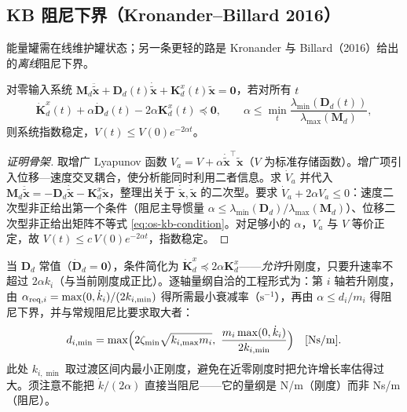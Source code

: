 \subsection{KB 阻尼下界（Kronander--Billard 2016）}
\label{sec:os-kb}

能量罐需在线维护罐状态；另一条更轻的路是 Kronander 与 Billard（2016）给出的\emph{离线}阻尼下界。

\begin{theorem}[KB 阻尼条件]
\label{thm:os-kb}
对零输入系统 $\mathbf M_d\ddot{\tilde{\mathbf x}}+\mathbf D_d(t)\dot{\tilde{\mathbf x}}+\mathbf K_d^x(t)\tilde{\mathbf x}=\mathbf 0$，若对所有 $t$
\begin{equation}
  \dot{\mathbf K}_d^x(t)+\alpha\dot{\mathbf D}_d(t)-2\alpha\mathbf K_d^x(t)\preceq\mathbf 0,\qquad
  \alpha\le\min_t\frac{\lambda_{\min}(\mathbf D_d(t))}{\lambda_{\max}(\mathbf M_d)},
  \label{eq:os-kb-condition}
\end{equation}
则系统指数稳定，$V(t)\le V(0)e^{-2\alpha t}$\cite{kronander2016stability}。
\end{theorem}
\begin{proof}[证明骨架]
取增广 Lyapunov 函数 $V_a=V+\alpha\dot{\tilde{\mathbf x}}^\top\tilde{\mathbf x}$（$V$ 为标准存储函数）。增广项引入位移—速度交叉耦合，使分析能同时利用二者信息。求 $\dot V_a$ 并代入 $\mathbf M_d\ddot{\tilde{\mathbf x}}=-\mathbf D_d\dot{\tilde{\mathbf x}}-\mathbf K_d^x\tilde{\mathbf x}$，整理出关于 $\dot{\tilde{\mathbf x}},\tilde{\mathbf x}$ 的二次型。要求 $\dot V_a+2\alpha V_a\le0$：速度二次型非正给出第一个条件（阻尼主导惯量 $\alpha\le\lambda_{\min}(\mathbf D_d)/\lambda_{\max}(\mathbf M_d)$）、位移二次型非正给出矩阵不等式 \cref{eq:os-kb-condition}。对足够小的 $\alpha$，$V_a$ 与 $V$ 等价正定，故 $V(t)\le c\,V(0)e^{-2\alpha t}$，指数稳定。
\end{proof}

当 $\mathbf D_d$ 常值（$\dot{\mathbf D}_d=\mathbf 0$），条件简化为 $\dot{\mathbf K}_d^x\preceq2\alpha\mathbf K_d^x$——\emph{允许}升刚度，只要升速率不超过 $2\alpha k_i$（与当前刚度成正比）。逐轴量纲自洽的工程形式为：第 $i$ 轴若升刚度，由 $\alpha_{{\rm req},i}=\max(0,\dot k_i)/(2k_{i,\min})$ 得所需最小衰减率（$\mathrm s^{-1}$），再由 $\alpha\le d_i/m_i$ 得阻尼下界，并与常规阻尼比要求取大者：
\begin{equation}
  d_{i,\min}=\max\Bigl(2\zeta_{\min}\sqrt{k_{i,\max}m_i},\ \frac{m_i\max(0,\dot k_i)}{2k_{i,\min}}\Bigr)\quad[\text{Ns/m}].
  \label{eq:os-kb-engineering}
\end{equation}
此处 $k_{i,\min}$ 取过渡区间内最小正刚度，避免在近零刚度时把允许增长率估得过大。须注意不能把 $\dot k/(2\alpha)$ 直接当阻尼——它的量纲是 N/m（刚度）而非 Ns/m（阻尼）。


